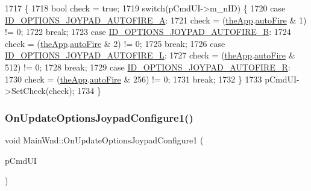 \begin{DoxyCode}
1717 \{
1718   \textcolor{keywordtype}{bool} check = \textcolor{keyword}{true};
1719   \textcolor{keywordflow}{switch}(pCmdUI->m\_nID) \{
1720   \textcolor{keywordflow}{case} \mbox{\hyperlink{resource_8h_a295b57d43c5594a6e73c0a0b1aa4edc0}{ID\_OPTIONS\_JOYPAD\_AUTOFIRE\_A}}:
1721     check = (\mbox{\hyperlink{_v_b_a_8cpp_a8095a9d06b37a7efe3723f3218ad8fb3}{theApp}}.\mbox{\hyperlink{class_v_b_a_a1a3c37d6609939c821133cf4a2cd9d0d}{autoFire}} & 1) != 0;
1722     \textcolor{keywordflow}{break};
1723   \textcolor{keywordflow}{case} \mbox{\hyperlink{resource_8h_a7ce1bd104b18c50c1143f0c8e4070db0}{ID\_OPTIONS\_JOYPAD\_AUTOFIRE\_B}}:
1724     check = (\mbox{\hyperlink{_v_b_a_8cpp_a8095a9d06b37a7efe3723f3218ad8fb3}{theApp}}.\mbox{\hyperlink{class_v_b_a_a1a3c37d6609939c821133cf4a2cd9d0d}{autoFire}} & 2) != 0;
1725     \textcolor{keywordflow}{break};
1726   \textcolor{keywordflow}{case} \mbox{\hyperlink{resource_8h_a6e0833aaa97974f57115b14f4ee4a8a0}{ID\_OPTIONS\_JOYPAD\_AUTOFIRE\_L}}:
1727     check = (\mbox{\hyperlink{_v_b_a_8cpp_a8095a9d06b37a7efe3723f3218ad8fb3}{theApp}}.\mbox{\hyperlink{class_v_b_a_a1a3c37d6609939c821133cf4a2cd9d0d}{autoFire}} & 512) != 0;
1728     \textcolor{keywordflow}{break};
1729   \textcolor{keywordflow}{case} \mbox{\hyperlink{resource_8h_a947d9881165823503943a9ea2375d987}{ID\_OPTIONS\_JOYPAD\_AUTOFIRE\_R}}:
1730     check = (\mbox{\hyperlink{_v_b_a_8cpp_a8095a9d06b37a7efe3723f3218ad8fb3}{theApp}}.\mbox{\hyperlink{class_v_b_a_a1a3c37d6609939c821133cf4a2cd9d0d}{autoFire}} & 256) != 0;
1731     \textcolor{keywordflow}{break};
1732   \}
1733   pCmdUI->SetCheck(check);
1734 \}
\end{DoxyCode}
\mbox{\label{class_main_wnd_a286f4a4cb4a6cfba840645853ab7132c}} 
\subsubsection{\texorpdfstring{On\+Update\+Options\+Joypad\+Configure1()}{OnUpdateOptionsJoypadConfigure1()}}
{\footnotesize\ttfamily void Main\+Wnd\+::\+On\+Update\+Options\+Joypad\+Configure1 (\begin{DoxyParamCaption}\item[{C\+Cmd\+UI $\ast$}]{p\+Cmd\+UI }\end{DoxyParamCaption})\hspace{0.3cm}{\ttfamily [protected]}}



